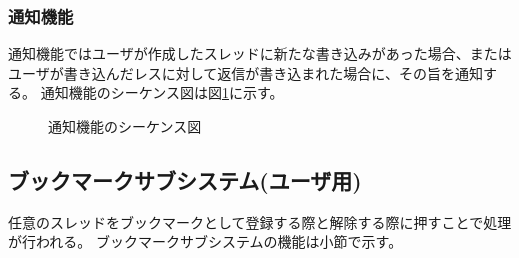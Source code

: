 \documentclass[a4j]{jarticle}
\begin{document}
  \subsubsection{通知機能}
  通知機能ではユーザが作成したスレッドに新たな書き込みがあった場合、またはユーザが書き込んだレスに対して返信が書き込まれた場合に、その旨を通知する。
  通知機能のシーケンス図は図\ref{fig:bbs_notice.png}に示す。
  \begin{figure}[H]
    \centering
    \caption{通知機能のシーケンス図}
    \label{fig:bbs_notice.png}
  \end{figure}




  \subsection{ブックマークサブシステム(ユーザ用)}
  任意のスレッドをブックマークとして登録する際と解除する際に押すことで処理が行われる。
  ブックマークサブシステムの機能は小節で示す。
\end{document}
